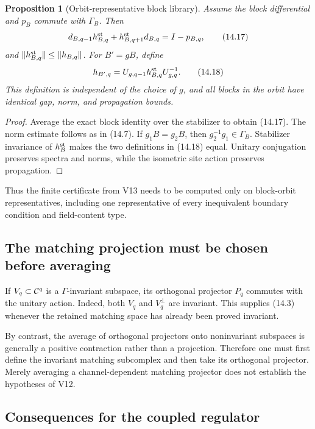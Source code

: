 \documentclass[11pt]{article}
\newtheorem{proposition}[theorem]{Proposition}
\theoremstyle{remark}
\begin{document}
\begin{proposition}[Orbit-representative block library]
\label{prop:v12v14-orbits}
Assume the block differential and \(p_B\) commute with
\(\Gamma_B\).  Then
\[
 d_{B,q-1}h_{B,q}^{\rm st}
 +h_{B,q+1}^{\rm st}d_{B,q}=I-p_{B,q},                     \tag{14.17}
\]
and \(\|h_{B,q}^{\rm st}\|\le\|h_{B,q}\|\).
For \(B'=gB\), define
\[
 h_{B',q}
 =U_{g,q-1}h_{B,q}^{\rm st}U_{g,q}^{-1}.                   \tag{14.18}
\]
This definition is independent of the choice of \(g\), and all
blocks in the orbit have identical gap, norm, and propagation
bounds.
\end{proposition}

\begin{proof}
Average the exact block identity over the stabilizer to obtain
(14.17).  The norm estimate follows as in (14.7).
If \(g_1B=g_2B\), then \(g_2^{-1}g_1\in\Gamma_B\).  Stabilizer
invariance of \(h_B^{\rm st}\) makes the two definitions in (14.18)
equal.  Unitary conjugation preserves spectra and norms, while the
isometric site action preserves propagation.
\end{proof}

Thus the finite certificate from V13 needs to be computed only on
block-orbit representatives, including one representative of every
inequivalent boundary condition and field-content type.

\subsection{The matching projection must be chosen before averaging}

If \(V_q\subset{\cal C}^q\) is a \(\Gamma\)-invariant subspace, its
orthogonal projector \(P_q\) commutes with the unitary action.
Indeed, both \(V_q\) and \(V_q^\perp\) are invariant.  This supplies
(14.3) whenever the retained matching space has already been proved
invariant.

By contrast, the average of orthogonal projectors onto
noninvariant subspaces is generally a positive contraction rather
than a projection.  Therefore one must first define the invariant
matching subcomplex and then take its orthogonal projector.  Merely
averaging a channel-dependent matching projector does not establish
the hypotheses of V12.

\subsection{Consequences for the coupled regulator}
\end{document}
